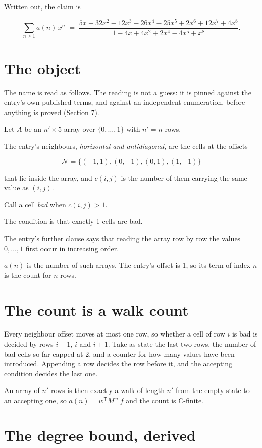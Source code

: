 \documentclass[11pt]{article}
\theoremstyle{definition}
\begin{document}
Written out, the claim is

\[\sum_{n \ge 1} a(n)\,x^n \;=\; \frac{5x + 32x^{2} - 12x^{3} - 26x^{4} - 25x^{5} + 2x^{6} + 12x^{7} + 4x^{8}}{1 - 4x + 4x^{2} + 2x^{4} - 4x^{5} + x^{8}}.\]

\section{The object}

The name is read as follows. The reading is not a guess: it is pinned against the entry's own published terms, and against an independent enumeration, before anything is proved (Section 7).

Let $A$ be an $n' \times 5$ array over $\{0,\dots,1\}$ with $n' = n$ rows.

The entry's neighbours, {\itshape horizontal and antidiagonal}, are the cells at the offsets

\[\mathcal{N} = \{(-1,1), (0,-1), (0,1), (1,-1)\}\]

that lie inside the array, and $c(i,j)$ is the number of them carrying the same value as $(i,j)$.

Call a cell {\itshape bad} when $c(i,j) > 1$.

The condition is that exactly 1 cells are bad.

The entry's further clause says that reading the array row by row the values $0,\dots,1$ first occur in increasing order.

$a(n)$ is the number of such arrays. The entry's offset is 1, so its term of index $n$ is the count for $n$ rows.

\section{The count is a walk count}

Every neighbour offset moves at most one row, so whether a cell of row $i$ is bad is decided by rows $i-1$, $i$ and $i+1$. Take as state the last two rows, the number of bad cells so far capped at 2, and a counter for how many values have been introduced. Appending a row decides the row before it, and the accepting condition decides the last one.

An array of $n'$ rows is then exactly a walk of length $n'$ from the empty state to an accepting one, so $a(n) = w^{\mathsf T}M^{\,n'}f$ and the count is C-finite.

\section{The degree bound, derived}
\end{document}
